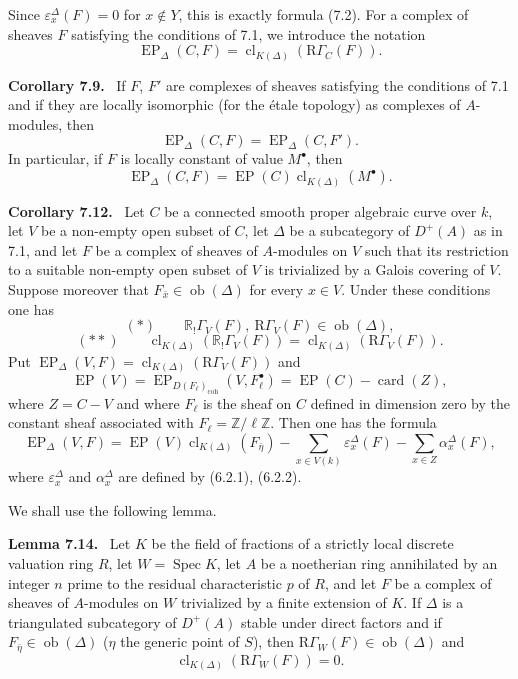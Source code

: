 \documentclass[11pt]{article}
\newenvironment{statement}[1]{\par\medskip\noindent\textbf{#1.}\ }{\par\medskip}
\DeclareMathOperator{\Spec}{Spec}
\providecommand{\EP}{\operatorname{EP}}
\providecommand{\coh}{\mathrm{coh}}
\providecommand{\Ob}{\operatorname{ob}}
\providecommand{\Ob}{\operatorname{ob}}
\providecommand{\Spec}{\operatorname{Spec}}
\providecommand{\EP}{\operatorname{EP}}
\providecommand{\Spec}{\operatorname{Spec}}
\providecommand{\Ob}{\operatorname{Ob}}
\providecommand{\coh}{\mathrm{coh}}
\providecommand{\clK}[1]{\operatorname{cl}_{K(#1)}}
\providecommand{\RG}{\mathrm R\Gamma}
\providecommand{\Spec}{\operatorname{Spec}}
\providecommand{\Ob}{\operatorname{ob}}
\providecommand{\Spec}{\operatorname{Spec}}
\providecommand{\Ob}{\operatorname{Ob}}
\begin{document}
Since $\varepsilon_x^\Delta(F)=0$ for $x\notin Y$, this is exactly formula (7.2). For a complex of sheaves $F$ satisfying the conditions of 7.1, we introduce the notation
\[
\EP_\Delta(C,F)=\clK{\Delta}(\RG_C(F)).
\]

\begin{statement}{Corollary 7.9}
If $F$, $F'$ are complexes of sheaves satisfying the conditions of 7.1 and if they are locally isomorphic (for the étale topology) as complexes of $A$-modules, then
\[
\EP_\Delta(C,F)=\EP_\Delta(C,F').
\tag{7.10}
\]
In particular, if $F$ is locally constant of value $M^\bullet$, then
\[
\EP_\Delta(C,F)=\EP(C)\clK{\Delta}(M^\bullet).
\tag{7.11}
\]
\end{statement}

\begin{statement}{Corollary 7.12}
Let $C$ be a connected smooth proper algebraic curve over $k$, let $V$ be a non-empty open subset of $C$, let $\Delta$ be a subcategory of $D^+(A)$ as in 7.1, and let $F$ be a complex of sheaves of $A$-modules on $V$ such that its restriction to a suitable non-empty open subset of $V$ is trivialized by a Galois covering of $V$. Suppose moreover that $F_{\bar x}\in\Ob(\Delta)$ for every $x\in V$. Under these conditions one has
\[
(*)\qquad \mathbb{R}_!\Gamma_V(F),\ \RG_V(F)\in\Ob(\Delta),
\]
\[
(**)\qquad
\clK{\Delta}(\mathbb{R}_!\Gamma_V(F))=\clK{\Delta}(\RG_V(F)).
\]
Put $\EP_\Delta(V,F)=\clK{\Delta}(\RG_V(F))$ and
\[
\EP(V)=\EP_{D(F_\ell)_{\coh}}(V,F_\ell^\bullet)=\EP(C)-\operatorname{card}(Z),
\]
where $Z=C-V$ and where $F_\ell$ is the sheaf on $C$ defined in dimension zero by the constant sheaf associated with $F_\ell=\mathbb Z/\ell\mathbb Z$. Then one has the formula
\[
\EP_\Delta(V,F)
=
\EP(V)\clK{\Delta}(F_{\bar\eta})
-\sum_{x\in V(k)}\varepsilon_x^\Delta(F)
-\sum_{x\in Z}\alpha_x^\Delta(F),
\tag{7.13}
\]
where $\varepsilon_x^\Delta$ and $\alpha_x^\Delta$ are defined by (6.2.1), (6.2.2).
\end{statement}

We shall use the following lemma.

\begin{statement}{Lemma 7.14}
Let $K$ be the field of fractions of a strictly local discrete valuation ring $R$, let $W=\Spec K$, let $A$ be a noetherian ring annihilated by an integer $n$ prime to the residual characteristic $p$ of $R$, and let $F$ be a complex of sheaves of $A$-modules on $W$ trivialized by a finite extension of $K$. If $\Delta$ is a triangulated subcategory of $D^+(A)$ stable under direct factors and if $F_{\bar\eta}\in\Ob(\Delta)$ ($\eta$ the generic point of $S$), then $\RG_W(F)\in\Ob(\Delta)$ and
\[
\clK{\Delta}(\RG_W(F))=0.
\]
\end{statement}
\end{document}
